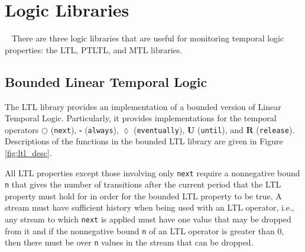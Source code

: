 \section{Logic Libraries}~\label{sec:logic}
There are three logic libraries that are useful for monitoring temporal logic
properties: the LTL, PTLTL, and MTL libraries.

\subsection{Bounded Linear Temporal Logic}
The LTL library provides an implementation of a bounded version of Linear
Temporal Logic. Particularly, it provides implementations for the temporal
operators $\bigcirc$ (\verb,next,), $\square$ (\verb,always,),
$\lozenge$ (\verb,eventually,), $\mathbf{U}$ (\verb,until,), and
$\mathbf{R}$ (\verb,release,). Descriptions of the functions in the
bounded LTL library are given in Figure \ref{fig:ltl_desc}.

All LTL properties except those involving only \verb,next,
require a nonnegative bound \verb,n, that gives the number of transitions
after the current period that the LTL property must hold for in order
for the bounded LTL property to be true.
A stream must have sufficient history when being used with
an LTL operator, i.e., any stream to which \verb,next, is applied must
have one value that may be dropped from it and if the nonnegative bound
\verb,n, of an LTL operator is greater than 0, then there must be over
\verb,n, values in the stream that can be dropped.

